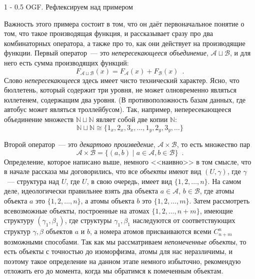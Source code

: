 \documentclass[a5paper]{article}
\makeatletter
\theoremstyle{definition}
\renewcommand{\subsection}{\@startsection
{subsection}%
{1}%
{\z@}%
{-\baselineskip}%
{0.5\baselineskip}%
{\centering\large\scshape}} %
\makeatother
\begin{document}
\subsection{OGF. Рефлексируем над примером}

Важность этого примера состоит в том, что он даёт первоначальное понятие о том, 
что такое производящая функция, и рассказывает сразу про два 
комбинаторных оператора, а также про то, как они действует на производящие 
функции. Первый оператор~--- это \textit{непересекающееся объединение}, \( 
\mathcal A 
\sqcup \mathcal B \), и для него есть сумма производящих функций:
\[
	F_{\mathcal A \sqcup \mathcal B}(x) = F_{\mathcal A}(x) + F_{\mathcal B}(x) 
	\enspace .
\]
Слово \textit{непересекающееся} здесь имеет чисто технический характер. Ясно, 
что бюллетень, который содержит три уровня, не может олновременно являться 
юллетенем, содержащим два уровня. (В противоположность базам данных, где 
автобус может являться троллейбусом). Так, например, непересекающееся 
объединение множеств \( \mathbb N \sqcup \mathbb N \) являет собой две копии \( 
\mathbb N \):
\[
	\mathbb N \sqcup \mathbb N \cong
	\{
		1_x, 2_x, 3_x, \ldots,
		1_y, 2_y, 3_y, \ldots
	\}
\]

Второй оператор~--- это \textit{декартово произведение}, \( \mathcal A \times 
\mathcal B \), то 
есть множество пар
\[
	\mathcal A \times \mathcal B = \{ (a, b) \mid a \in \mathcal A, b \in 
	\mathcal B \} \enspace .
\]
Определение, которое написано выше, немного <<наивно>> в том смысле, что в 
начале рассказа мы договорились, что все \textit{объекты} имеют вид \( (U, 
\gamma) \), где \( \gamma \)~--- структура над \( U \), где \( U \), в свою 
очередь, имеет вид \( \{ 1, 2, \ldots, n \} \). На самом деле, идеологически 
правильнее взять два объекта \( a \in \mathcal A \), \( b \in \mathcal B \), 
где атомы объекта \( a \) это \( \{ 1, 2, \ldots, n \} \), а атомы объекта \( b 
\) это \( \{1,2,\ldots, m  \} \). Затем рассмотреть всевозможные объекты, 
построенные на атомах \( \{ 1, 2, \ldots, n+m \} \), имеющие структуру \( 
(\gamma_1, \beta_1) \), где структуры \( \gamma_1, \beta_1 \) наследуются от  
соответствующих структур \( \gamma, \beta \) объектов \( a \) и \( b \), а 
номера атомов присваиваются всеми \( 
C_{n+m}^{n} \) возможными способами. Так как мы рассматриваем 
\textit{непомеченные объекты}, то есть объекты с точностью до изоморфизма, 
атомы для нас неразличимы, и поэтому такое определение на данном этапе немного 
избыточно, рекомендую отложить его до момента, когда мы обратимся к помеченным 
объектам.
\end{document}
